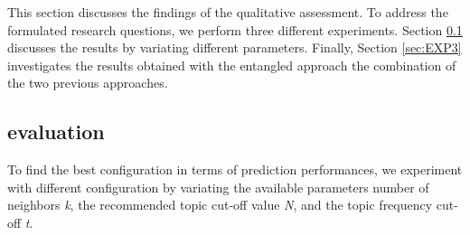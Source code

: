 This section discusses the findings of the qualitative assessment. To address the formulated research questions, we perform three different experiments. Section \ref{sec:EXP1} discusses the \CT results by variating different parameters. %
Finally, Section \ref{sec:EXP3} investigates the results obtained with the entangled approach \ie the combination of the two previous approaches. 


\subsection{\CT evaluation} \label{sec:EXP1}
 \rqfirst
To find the best configuration in terms of prediction performances, we experiment with different \CT configuration by variating the available parameters \ie number of neighbors \emph{k}, the recommended topic cut-off value \emph{N}, and the topic frequency cut-off \emph{t}.   %


